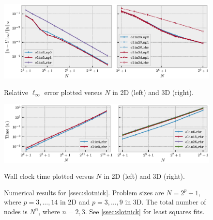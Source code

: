 \documentclass[sisc-eikonal.tex]{subfiles}
\begin{document}
\begin{figure}
  \centering
  \vspace{-1em} \includegraphics[width=\linewidth]{qv_plots.eps}%
  \vspace{-1.5em}
  \caption{Relative $\ell_\infty$ error plotted versus $N$ in 2D
    (left) and 3D (right).}\label{fig:qv}
  \vspace{-1em} \includegraphics[width=\linewidth]{qv-time-plots.eps}%
  \vspace{-1.5em}
  \caption{Wall clock time plotted versus $N$ in 2D (left) and 3D
    (right).}\label{fig:qv-time-plots}
  \vspace{-1em}
  \caption*{Numerical results for \cref{ssec:slotnick}. Problem sizes
    are $N = 2^p + 1$, where $p = 3, \hdots, 14$ in 2D and
    $p = 3, \hdots, 9$ in 3D. The total number of nodes is $N^n$,
    where $n = 2, 3$. See \cref{ssec:slotnick} for least squares
    fits.}
\end{figure}
\end{document}
